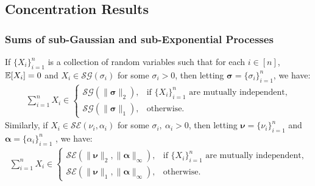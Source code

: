 \subsection{Concentration Results}
\label{app:concentration}

\subsubsection{Sums of sub-Gaussian and sub-Exponential Processes}

\begin{lemma}\label{lemma:sum-sub-gaussian}
If $\{X_i\}_{i=1}^n$ is a collection of random variables such that for each $i \in [n]$, $\mathbb{E}[X_i] = 0$ and $X_i \in \mathcal{SG}(\sigma_i)$ for some $\sigma_i > 0$, then letting $\boldsymbol{\sigma} = \{\sigma_i\}_{i=1}^n$, we have:
\begin{align*}
    \sum_{i=1}^n X_i \in 
    \begin{cases}
        \mathcal{SG}(\lVert \boldsymbol{\sigma}\rVert_2), &\text{if $\{X_i\}_{i=1}^n$ are mutually independent,} \\
        \mathcal{SG}(\lVert \boldsymbol{\sigma}\rVert_1), &\text{otherwise.}
    \end{cases}
\end{align*}
Similarly, if $X_i \in \mathcal{SE}(\nu_i, \alpha_i)$ for some $\sigma_i,\:\alpha_i > 0$, then letting $\boldsymbol{\nu} = \{\nu_i\}_{i=1}^n$ and $\boldsymbol{\alpha} = \{\alpha_i\}_{i=1}^n$ , we have:
\begin{align*}
    \sum_{i=1}^n X_i \in 
    \begin{cases}
        \mathcal{SE}(\lVert \boldsymbol{\nu}\rVert_2, \lVert \boldsymbol{\alpha}\rVert_\infty), &\text{if $\{X_i\}_{i=1}^n$ are mutually independent,} \\
        \mathcal{SE}(\lVert \boldsymbol{\nu}\rVert_1,  \lVert \boldsymbol{\alpha}\rVert_\infty), &\text{otherwise.}
    \end{cases}
\end{align*}
\end{lemma}

